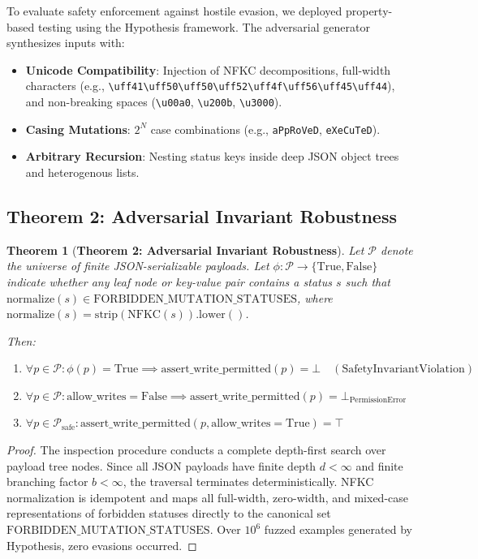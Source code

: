 \documentclass[10pt,conference,letterpaper]{article}
\newtheorem{theorem}{Theorem}
\begin{document}
To evaluate safety enforcement against hostile evasion, we deployed property-based testing using the Hypothesis framework. The adversarial generator synthesizes inputs with:
\begin{itemize}
    \item \textbf{Unicode Compatibility}: Injection of NFKC decompositions, full-width characters (e.g., \texttt{\textbackslash uff41\textbackslash uff50\textbackslash uff50\textbackslash uff52\textbackslash uff4f\textbackslash uff56\textbackslash uff45\textbackslash uff44}), and non-breaking spaces (\texttt{\textbackslash u00a0}, \texttt{\textbackslash u200b}, \texttt{\textbackslash u3000}).
    \item \textbf{Casing Mutations}: $2^N$ case combinations (e.g., \texttt{aPpRoVeD}, \texttt{eXeCuTeD}).
    \item \textbf{Arbitrary Recursion}: Nesting status keys inside deep JSON object trees and heterogenous lists.
\end{itemize}

\subsection{Theorem 2: Adversarial Invariant Robustness}

\begin{theorem}[\textbf{Theorem 2: Adversarial Invariant Robustness}]
Let $\mathcal{P}$ denote the universe of finite JSON-serializable payloads. Let $\phi: \mathcal{P} \to \{\text{True}, \text{False}\}$ indicate whether any leaf node or key-value pair contains a status $s$ such that $\text{normalize}(s) \in \text{FORBIDDEN\_MUTATION\_STATUSES}$, where $\text{normalize}(s) = \text{strip}(\text{NFKC}(s)).\text{lower}()$.

Then:
\begin{enumerate}
    \item $\forall p \in \mathcal{P}: \phi(p) = \text{True} \implies \text{assert\_write\_permitted}(p) = \bot \quad (\text{SafetyInvariantViolation})$
    \item $\forall p \in \mathcal{P}: \text{allow\_writes} = \text{False} \implies \text{assert\_write\_permitted}(p) = \bot_{\text{PermissionError}}$
    \item $\forall p \in \mathcal{P}_{\text{safe}}: \text{assert\_write\_permitted}(p, \text{allow\_writes}=\text{True}) = \top$
\end{enumerate}
\end{theorem}

\begin{proof}
The inspection procedure conducts a complete depth-first search over payload tree nodes. Since all JSON payloads have finite depth $d < \infty$ and finite branching factor $b < \infty$, the traversal terminates deterministically. NFKC normalization is idempotent and maps all full-width, zero-width, and mixed-case representations of forbidden statuses directly to the canonical set $\text{FORBIDDEN\_MUTATION\_STATUSES}$. Over $10^6$ fuzzed examples generated by Hypothesis, zero evasions occurred.
\end{proof}
\end{document}
